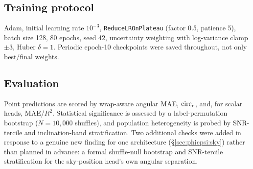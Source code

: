 \subsection{Training protocol}
\label{sec:phicpsi:protocol}

Adam, initial learning rate $10^{-3}$, \texttt{ReduceLROnPlateau} (factor 0.5, patience 5), batch size 128, 80 epochs, seed 42, uncertainty weighting with log-variance clamp $\pm3$, Huber $\delta=1$.
Periodic epoch-10 checkpoints were saved throughout, not only best/final weights.

\subsection{Evaluation}
\label{sec:phicpsi:evaluation}

Point predictions are scored by wrap-aware angular MAE, $\text{circ}_r$, and, for scalar heads, MAE/$R^2$.
Statistical significance is assessed by a label-permutation bootstrap ($N=10{,}000$ shuffles), and population heterogeneity is probed by SNR-tercile and inclination-band stratification.
Two additional checks were added in response to a genuine new finding for one architecture (\S\ref{sec:phicpsi:sky}) rather than planned in advance: a formal shuffle-null bootstrap and SNR-tercile stratification for the sky-position head's own angular separation.
